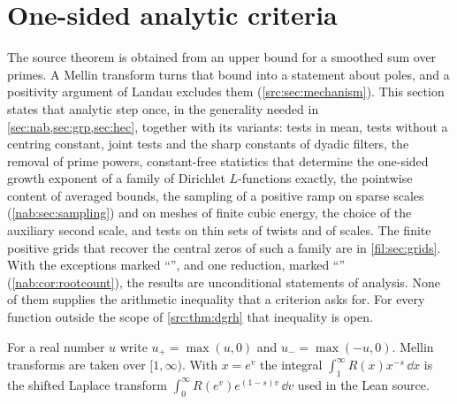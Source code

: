 \providecommand{\nabFix}{\operatorname{Fix}}
\providecommand{\nabIrr}{\operatorname{Irr}}
\providecommand{\nabsgn}{\operatorname{sgn}}
\providecommand{\nabone}{\mathbf{1}}
\providecommand{\nabpos}[1]{(#1)^{+}}
\providecommand{\anapos}[1]{\bigl(#1\bigr)_{+}}
\providecommand{\ananeg}[1]{\bigl(#1\bigr)_{-}}
\providecommand{\anaone}{\mathbf{1}}
\providecommand{\anaE}{\mathcal{E}}
\providecommand{\anaEx}{\mathbb{E}}
\providecommand{\anaPr}{\mathbb{P}}
\providecommand{\anaM}{\mathcal{M}}
\providecommand{\anaW}{\mathcal{W}}
\providecommand{\anaZ}{\mathcal{Z}}
\providecommand{\anaC}{\mathcal{C}}

\section{One-sided analytic criteria}\label{sec:ana}

The source theorem is obtained from an upper bound for a smoothed sum over primes. A Mellin
transform turns that bound into a statement about poles, and a positivity argument of Landau
excludes them (\cref{src:sec:mechanism}). This section states that analytic step once, in the
generality needed in \cref{sec:nab,sec:grp,sec:hec}, together with its variants: tests in mean,
tests without a centring constant, joint tests and the sharp constants of dyadic filters, the
removal of prime powers, constant-free statistics that determine the one-sided growth
exponent of a family of Dirichlet $L$-functions exactly, the pointwise content of averaged
bounds, the sampling of a positive ramp on sparse scales (\cref{nab:sec:sampling}) and on
meshes of finite cubic energy, the choice of the auxiliary second scale, and tests on thin sets
of twists and of scales. The finite positive grids that recover the central zeros of such a
family are in \cref{fil:sec:grids}. With the exceptions
marked ``\stG'', and one reduction, marked ``\stR'' (\cref{nab:cor:rootcount}), the results are unconditional statements of analysis. None of them supplies
the arithmetic inequality that a criterion asks for. For every function outside the scope of
\cref{src:thm:dgrh} that inequality is open.

For a real number $u$ write $u_+=\max(u,0)$ and $u_-=\max(-u,0)$. Mellin transforms are taken
over $[1,\infty)$. With $x=e^v$ the integral $\int_1^\infty R(x)x^{-s}\,\dd x$ is the shifted
Laplace transform $\int_0^\infty R(e^v)e^{(1-s)v}\,\dd v$ used in the Lean source.

